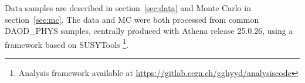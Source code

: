 Data samples are described in section~\ref{sec:data} and Monte Carlo in section~\ref{sec:mc}. The data and MC were both processed from common DAOD\_PHYS samples, centrally produced with Athena release 25.0.26, using a framework based on SUSYTools \footnote{Analysis framework available at \href{https://gitlab.cern.ch/gghyyd/analysiscode}{https://gitlab.cern.ch/gghyyd/analysiscode}}.
